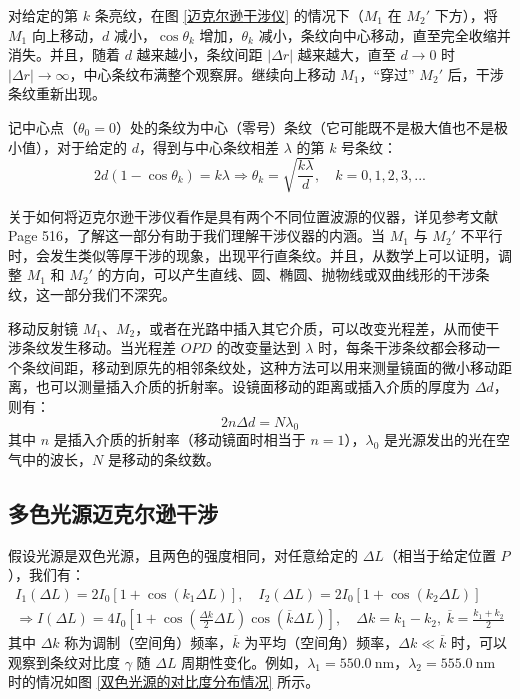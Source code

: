 \documentclass[UTF8]{report}
\theoremstyle{MyLineTheoremStyle} %
\theoremstyle{MyBlockTheoremStyle} %
\theoremstyle{MySubsubsectionStyle} %
\begin{document}
对给定的第 $k$ 条亮纹，在图 \ref{迈克尔逊干涉仪} 的情况下（$M_1$ 在 $M_2'$ 下方），将 $M_1$ 向上移动，$d$ 减小，$\cos \theta_k$ 增加，$\theta_k$ 减小，条纹向中心移动，直至完全收缩并消失。并且，随着 $d$ 越来越小，条纹间距 $| \Delta r |$ 越来越大，直至 $d \to 0$ 时 $| \Delta r | \to \infty$，中心条纹布满整个观察屏。继续向上移动 $M_1$，“穿过” $M_2'$ 后，干涉条纹重新出现。

记中心点（$\theta_0 = 0$）处的条纹为中心（零号）条纹（它可能既不是极大值也不是极小值），对于给定的 $d$，得到与中心条纹相差 $\lambda$ 的第 $k$ 号条纹：
\begin{equation}
2d (1 - \cos \theta_k) = k \lambda \Longrightarrow \theta_k = \sqrt{\frac{k\lambda}{d}},\quad k = 0, 1, 2, 3, ... 
\end{equation}

关于如何将迈克尔逊干涉仪看作是具有两个不同位置波源的仪器，详见参考文献 \cite{Optics} Page 516，了解这一部分有助于我们理解干涉仪器的内涵。当 $M_1$ 与 $M_2'$ 不平行时，会发生类似等厚干涉的现象，出现平行直条纹。并且，从数学上可以证明，调整 $M_1$ 和 $M_2'$ 的方向，可以产生直线、圆、椭圆、抛物线或双曲线形的干涉条纹，这一部分我们不深究。

移动反射镜 $M_1$、$M_2$，或者在光路中插入其它介质，可以改变光程差，从而使干涉条纹发生移动。当光程差 $OPD$ 的改变量达到 $\lambda$ 时，每条干涉条纹都会移动一个条纹间距，移动到原先的相邻条纹处，这种方法可以用来测量镜面的微小移动距离，也可以测量插入介质的折射率。设镜面移动的距离或插入介质的厚度为 $\Delta d$，则有：
\begin{equation}
2n\Delta d = N\lambda_0
\end{equation}
其中 $n$ 是插入介质的折射率（移动镜面时相当于 $n=1$），$\lambda_0$ 是光源发出的光在空气中的波长，$N$ 是移动的条纹数。

\subsection{多色光源迈克尔逊干涉}\label{多色光源迈克尔逊干涉}

假设光源是双色光源，且两色的强度相同，对任意给定的 $\Delta L$（相当于给定位置 $P$），我们有：
\begin{gather}
I_1(\Delta L) = 2I_0 \left[1 + \cos \left(k_1 \Delta L\right)\right],\quad I_2(\Delta L) = 2I_0 \left[1 + \cos \left(k_2 \Delta L\right)\right] \\ 
\Longrightarrow I(\Delta L) = 4 I_0 \left[ 1 + \cos \left(\frac{\Delta k}{2}\Delta L\right)\cos(\overline{k} \Delta L) \right],\quad \Delta k = k_1 - k_2,\ \overline{k} = \frac{k_1 + k_2}{2}
\end{gather}
其中 $\Delta k$ 称为调制（空间角）频率，$\overline{k}$ 为平均（空间角）频率，$\Delta k \ll \overline{k}$ 时，可以观察到条纹对比度 $\gamma$ 随 $\Delta L$ 周期性变化。例如，$\lambda_1 = 550.0\ \mathrm{nm}$，$\lambda_2 = 555.0\ \mathrm{nm}$ 时的情况如图 \ref{双色光源的对比度分布情况} 所示。
\end{document}
